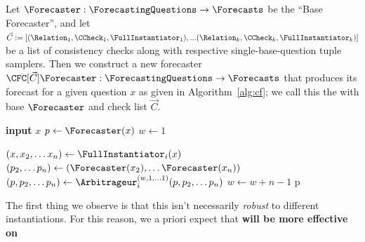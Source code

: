 \begin{definition}[\CFCaster{}]
Let $\Forecaster:\ForecastingQuestions\to\Forecasts$ be the ``Base Forecaster'', and let $\vec{C}:=[(\Relation_1,\CCheck_1,\FullInstantiator_1),...(\Relation_k,\CCheck_k,\FullInstantiator_k)]$ be a list of consistency checks along with respective single-base-question tuple samplers. Then we construct a new forecaster $\CFC[\vec{C}]{\Forecaster}:\ForecastingQuestions\to\Forecasts$ that produces its forecast for a given question $x$ as given in Algorithm~\ref{alg:cf}; we call this the \CFCaster{} with base $\Forecaster$ and check list $\vec{C}$.

\begin{algorithm}[tb]
\caption{\CFCaster{} algorithm: $\CFC[\vec{C}]{\Forecaster}$}
\label{alg:cf}
\begin{algorithmic}

\State \textbf{input} $x$
\State $p\gets\Forecaster(x)$
\State $w\gets 1$

\State $(x,x_2,\dots x_n) \gets \FullInstantiator_i(x)$
\State $(p_2,\dots p_n) \gets (\Forecaster(x_2),\dots\Forecaster(x_n))$
\State $(p,p_2,\dots p_n) \gets \Arbitrageur_i^{(w,1,\dots 1)}(p,p_2,\dots p_n)$
\State $w\gets w+n-1$
\EndFor
\State\Return p

\end{algorithmic}
\end{algorithm}

\label{def:cf}
\end{definition}

The first thing we observe is that this isn't necessarily \emph{robust} to different instantiations. For this reason, we a priori expect that \textbf{\CFCaster{} will be more effective on }


